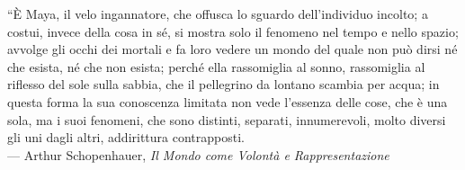 
\normalsize
“È Maya, il velo ingannatore, che offusca lo sguardo dell’individuo incolto; a costui, invece della cosa in sé, si mostra solo il fenomeno nel tempo e nello spazio; avvolge gli occhi dei mortali e fa loro vedere un mondo del quale non può dirsi né che esista, né che non esista; perché ella rassomiglia al sonno, rassomiglia al riflesso del sole sulla sabbia, che il pellegrino da lontano scambia per acqua; in questa forma la sua conoscenza limitata non vede l’essenza delle cose, che è una sola, ma i suoi fenomeni, che sono distinti, separati, innumerevoli, molto diversi gli uni dagli altri, addirittura contrapposti.\\
\footnotesize
--- Arthur Schopenhauer, \textit{Il Mondo come Volontà e Rappresentazione}\\


\normalsize
